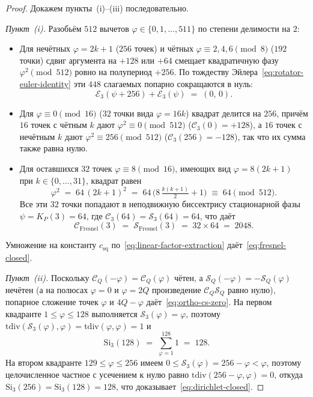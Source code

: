 \documentclass[11pt,a4paper]{article}
\theoremstyle{plain}
\theoremstyle{definition}
\begin{document}
\begin{proof}
Докажем пункты~(i)--(iii) последовательно.

\emph{Пункт~(i).} Разобьём $512$ вычетов $\varphi \in \{0, 1, \dots, 511\}$ по степени делимости на $2$:
\begin{itemize}[leftmargin=*]
\item Для нечётных $\varphi = 2k + 1$ ($256$ точек) и чётных $\varphi \equiv 2, 4, 6 \pmod 8$ ($192$ точки) сдвиг аргумента на $+128$ или $+64$ смещает квадратичную фазу $\varphi^2 \pmod{512}$ ровно на полупериод $+256$. По тождеству Эйлера~\eqref{eq:rotator-euler-identity} эти $448$ слагаемых попарно сокращаются в нуль:
  \begin{equation*}
    \mathcal{E}_3(\psi + 256) + \mathcal{E}_3(\psi) \;=\; (0,\, 0).
  \end{equation*}
\item Для $\varphi \equiv 0 \pmod{16}$ ($32$ точки вида $\varphi = 16k$) квадрат делится на $256$, причём $16$ точек с чётным $k$ дают $\varphi^2 \equiv 0 \pmod{512}$ ($\mathcal{C}_3(0) = +128$), а $16$ точек с нечётным $k$ дают $\varphi^2 \equiv 256 \pmod{512}$ ($\mathcal{C}_3(256) = -128$), так что их сумма также равна нулю.
\item Для оставшихся $32$ точек $\varphi \equiv 8 \pmod{16}$, имеющих вид $\varphi = 8(2k + 1)$ при $k \in \{0, \dots, 31\}$, квадрат равен
  \begin{equation*}
    \varphi^2 \;=\; 64\,(2k + 1)^2 \;=\; 64\,\bigl(8\,\tfrac{k(k+1)}{2} + 1\bigr) \;\equiv\; 64 \pmod{512}.
  \end{equation*}
  Все эти $32$ точки попадают в неподвижную биссектрису стационарной фазы $\psi = K_P(3) = 64$, где $\mathcal{C}_3(64) = \mathcal{S}_3(64) = 64$, что даёт
  \begin{equation*}
    \mathcal{C}_{\mathrm{Fresnel}}(3) \;=\; \mathcal{S}_{\mathrm{Fresnel}}(3) \;=\; 32 \times 64 \;=\; 2048.
  \end{equation*}
\end{itemize}
Умножение на константу $c_{\mathrm{sq}}$ по~\eqref{eq:linear-factor-extraction} даёт~\eqref{eq:fresnel-closed}.

\emph{Пункт~(ii).} Поскольку $\mathcal{C}_Q(-\varphi) = \mathcal{C}_Q(\varphi)$ чётен, а $\mathcal{S}_Q(-\varphi) = -\mathcal{S}_Q(\varphi)$ нечётен (а на полюсах $\varphi = 0$ и $\varphi = 2Q$ произведение $\mathcal{C}_Q\mathcal{S}_Q$ равно нулю), попарное сложение точек $\varphi$ и $4Q - \varphi$ даёт~\eqref{eq:ortho-cs-zero}. На первом квадранте $1 \le \varphi \le 128$ выполняется $\mathcal{S}_3(\varphi) = \varphi$, поэтому $\mathrm{tdiv}(\mathcal{S}_3(\varphi), \varphi) = \mathrm{tdiv}(\varphi, \varphi) = 1$ и
\begin{equation*}
  \mathrm{Si}_3(128) \;=\; \sum_{\varphi=1}^{128} 1 \;=\; 128.
\end{equation*}
На втором квадранте $129 \le \varphi \le 256$ имеем $0 \le \mathcal{S}_3(\varphi) = 256 - \varphi < \varphi$, поэтому целочисленное частное с усечением к нулю равно $\mathrm{tdiv}(256 - \varphi, \varphi) = 0$, откуда $\mathrm{Si}_3(256) = \mathrm{Si}_3(128) = 128$, что доказывает~\eqref{eq:dirichlet-closed}.


\end{proof}
\end{document}
